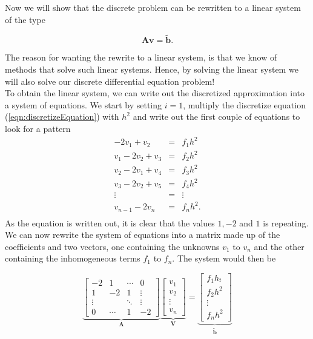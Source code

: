 \documentclass{article}
\begin{document}
Now we will show that the discrete problem can be rewritten to a linear system of the type 

\begin{equation*}
\mathbf{A}\mathbf{v} = \tilde{\mathbf{b}}.
\end{equation*}

The reason for wanting the rewrite to a linear system, is that we know of methods that solve such linear systems. Hence, by solving the linear system we will also solve our discrete differential equation problem!\\

To obtain the linear system, we can write out the discretized approximation into a system of equations. We start by setting $i=1$, multiply the discretize equation (\ref{eqn:discretizeEquation}) with $h^2$ and write out the first couple of equations to look for a pattern
\begin{eqnarray}
\nonumber
-2v_1 + v_2 &=& f_1h^2 \\ \nonumber
v_1 - 2v_2 +v_3 &=& f_2h^2 \\ \nonumber
v_2 - 2v_1 +v_4 &=& f_3h^2 \\ \nonumber
v_3 - 2v_2 +v_5 &=& f_4h^2 \\ \nonumber
\vdots &=& \vdots \\ \nonumber
v_{n-1} - 2v_n &=& f_nh^2. \\ \nonumber
\end{eqnarray}
As the equation is written out, it is clear that the values $1, -2$ and $1$ is repeating. We can now rewrite the system of equations into a matrix made up of the coefficients and two vectors, one containing the unknowns $v_1$ to $v_{n}$ and the other containing the inhomogeneous terms $f_1$ to $f_{n}$. The system would then be 

\begin{equation}
\underbrace{\begin{bmatrix} -2 & 1 & \cdots & 0 \\ 1 & -2 & 1 & \vdots \\
\vdots & &  \ddots & \vdots \\ 
0 & \cdots & 1 & -2 \end{bmatrix}}_{\mathbf{A}} 
\underbrace{\begin{bmatrix} v_1\\ v_2 \\ \vdots\\ v_{n} \end{bmatrix}}_{\mathbf{V}} = 
\underbrace{\begin{bmatrix} f_1h_^2\\ f_2h^2 \\ \vdots \\ f_{n}h^2\end{bmatrix}}_{\mathbf{\tilde{b}}} 
\end{equation}
\end{document}
